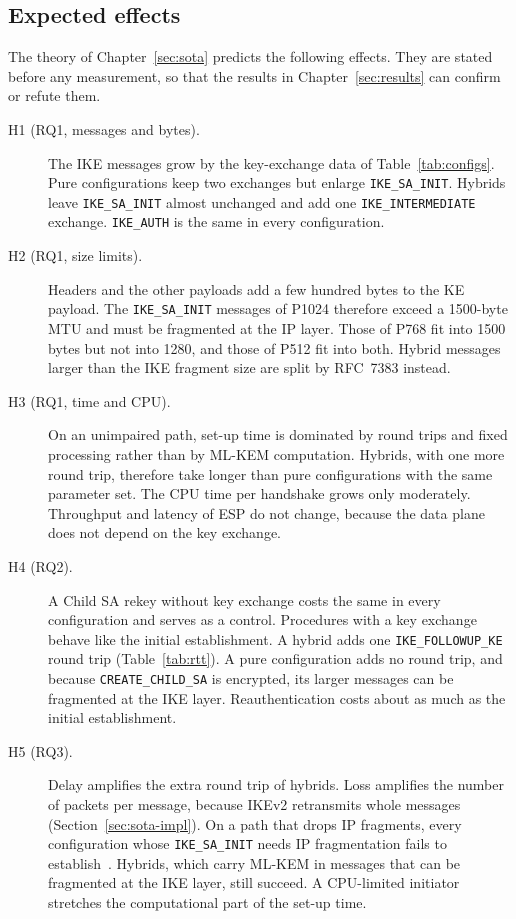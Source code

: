 \subsection{Expected effects}
\label{sec:analysis-hypotheses}

The theory of Chapter~\ref{sec:sota} predicts the following effects. They are
stated before any measurement, so that the results in
Chapter~\ref{sec:results} can confirm or refute them.
\begin{description}
    \item[H1 (RQ1, messages and bytes).] The IKE messages grow by the
    key-exchange data of Table~\ref{tab:configs}. Pure configurations keep
    two exchanges but enlarge \texttt{IKE\_SA\_INIT}. Hybrids leave
    \texttt{IKE\_SA\_INIT} almost unchanged and add one
    \texttt{IKE\_INTERMEDIATE} exchange. \texttt{IKE\_AUTH} is the same in
    every configuration.
    \item[H2 (RQ1, size limits).] Headers and the other payloads add a few
    hundred bytes to the KE payload. The \texttt{IKE\_SA\_INIT} messages of
    P1024 therefore exceed a 1500-byte MTU and must be fragmented at the IP
    layer. Those of P768 fit into 1500 bytes but not into 1280, and those of
    P512 fit into both. Hybrid messages larger than the IKE fragment size are
    split by RFC~7383 instead.
    \item[H3 (RQ1, time and CPU).] On an unimpaired path, set-up time is
    dominated by round trips and fixed processing rather than by ML-KEM
    computation. Hybrids, with one more round trip, therefore take longer than
    pure configurations with the same parameter set. The CPU time per
    handshake grows only moderately. Throughput and latency of ESP do not
    change, because the data plane does not depend on the key exchange.
    \item[H4 (RQ2).] A Child SA rekey without key exchange costs the same in
    every configuration and serves as a control. Procedures with a key
    exchange behave like the initial establishment. A hybrid adds one
    \texttt{IKE\_FOLLOWUP\_KE} round trip (Table~\ref{tab:rtt}). A pure
    configuration adds no round trip, and because \texttt{CREATE\_CHILD\_SA}
    is encrypted, its larger messages can be fragmented at the IKE layer.
    Reauthentication costs about as much as the initial establishment.
    \item[H5 (RQ3).] Delay amplifies the extra round trip of hybrids. Loss
    amplifies the number of packets per message, because IKEv2 retransmits
    whole messages (Section~\ref{sec:sota-impl}). On a path that drops IP
    fragments, every configuration whose \texttt{IKE\_SA\_INIT} needs IP
    fragmentation fails to establish~\cite{rfc7383}. Hybrids, which carry
    ML-KEM in messages that can be fragmented at the IKE layer, still succeed.
    A CPU-limited initiator stretches the computational part of the set-up
    time.
\end{description}
